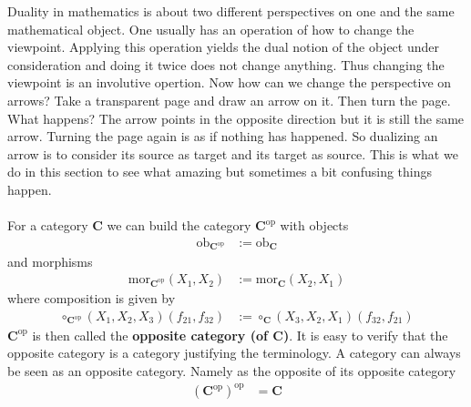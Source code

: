Duality in mathematics is about two different perspectives on one and the same mathematical object. One usually has an operation of how to change the viewpoint. Applying this operation yields the dual notion of the object under consideration and doing it twice does not change anything. Thus changing the viewpoint is an involutive opertion. Now how can we change the perspective on arrows? Take a transparent page and draw an arrow on it. Then turn the page. What happens? The arrow points in the opposite direction but it is still the same arrow. Turning the page again is as if nothing has happened. So dualizing an arrow is to consider its source as target and its target as source. This is what we do in this section to see what amazing but sometimes a bit confusing things happen.
\\\\
For a category $\mathbf{C}$ we can build the category $\mathbf{C}^{\mathrm{op}}$ with objects
\begin{align*}
  \mathrm{ob}_{\mathbf{C}^{\mathrm{op}}}
  &:=
  \mathrm{ob}_{\mathbf{C}}
\end{align*}
and morphisms
\begin{align*}
  \mathrm{mor}_{\mathbf{C}^{\mathrm{op}}}(X_{1},X_{2})
  &:=
  \mathrm{mor}_{\mathbf{C}}(X_{2},X_{1})
\end{align*}
where composition is given by
\begin{align*}
  \circ_{\mathbf{C}^{\mathrm{op}}}
  (X_{1},X_{2},X_{3})
  (f_{21},f_{32})
  &:=
  \circ_{\mathbf{C}}
  (X_{3},X_{2},X_{1})
  (f_{32},f_{21})
\end{align*}
$\mathbf{C}^{\mathrm{op}}$ is then called the \textbf{opposite category (of $\mathbf{C}$)}. It is easy to verify that the opposite category is a category justifying the terminology. A category can always be seen as an opposite category. Namely as the opposite of its opposite category
\begin{align*}
  \left(
    \mathbf{C}^{\mathrm{op}}
  \right)^{\mathrm{op}}
  &=
  \mathbf{C}
\end{align*}
